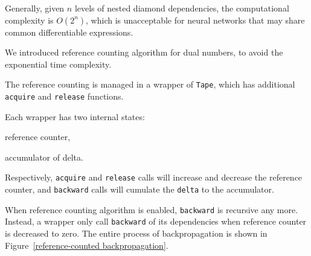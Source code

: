 Generally, given $n$ levels of nested diamond dependencies, the computational complexity is $O(2^n)$, which is unacceptable for neural networks that may share common \glspl{differentiable expression}.

We introduced reference counting algorithm for dual numbers, to avoid the exponential time complexity.

The reference counting is managed in a wrapper of \lstinline{Tape}, which has additional \lstinline{acquire} and \lstinline{release} functions.

Each wrapper has two internal states:
\begin{enumerate*}
  \item reference counter,
  \item accumulator of delta.
\end{enumerate*}
Respectively, \lstinline{acquire} and \lstinline{release} calls will increase and decrease the reference counter, and \lstinline{backward} calls will cumulate the \lstinline{delta} to the accumulator.

When reference counting algorithm is enabled, \lstinline{backward} is recursive any more. Instead, a wrapper only call \lstinline{backward} of its dependencies when reference counter is decreased to zero. The entire process of backpropagation is shown in Figure~\ref{reference-counted backpropagation}.

